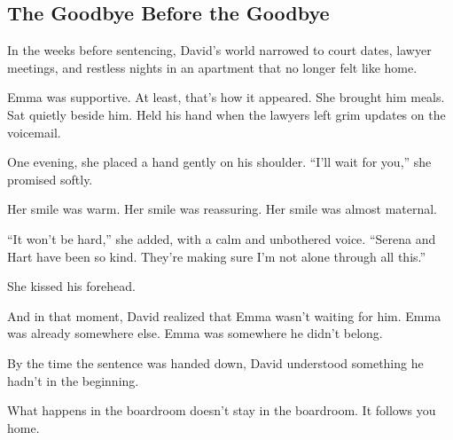 \subsection{The Goodbye Before the Goodbye}

In the weeks before sentencing, David’s world narrowed to court dates, lawyer meetings, and restless 
nights in an apartment that no longer felt like home.

Emma was supportive. At least, that’s how it appeared.  
She brought him meals. Sat quietly beside him. Held his hand when the lawyers left grim updates on the voicemail.

One evening, she placed a hand gently on his shoulder.  
“I’ll wait for you,” she promised softly.  

Her smile was warm. Her smile was reassuring. Her smile was almost maternal.  

“It won’t be hard,” she added, with a calm and unbothered voice.
“Serena and Hart have been so kind. They’re making sure I’m not alone through all this.”

She kissed his forehead.

And in that moment, David realized that 
Emma wasn’t waiting for him.  
Emma was already somewhere else.  
Emma was somewhere he didn't belong.

By the time the sentence was handed down,  
David understood something he hadn’t in the beginning. 

What happens in the boardroom doesn't stay in the boardroom.  It follows you home.

\medskip

